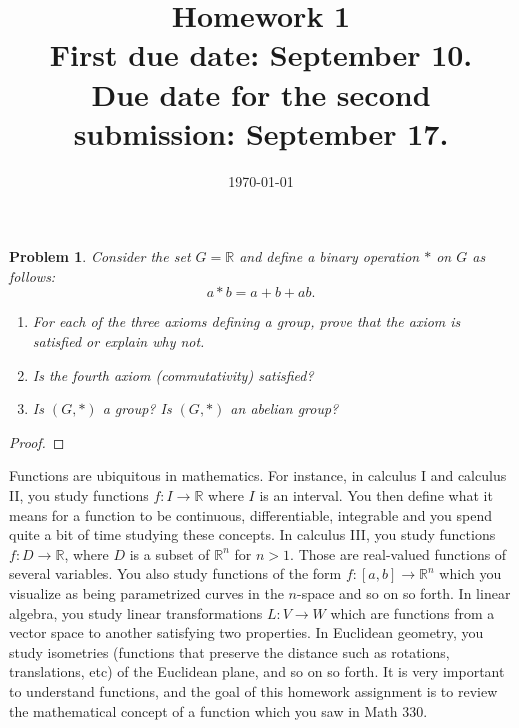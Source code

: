 \documentclass[reqno]{amsart}
\theoremstyle{plain}
\newtheorem{problem}{Problem}
\theoremstyle{definition}
\begin{document}
 

\title[Homework 1]{Homework 1 \\ First due date: September 10.  \\  Due date for the second submission:  September 17.}

\date{\today} 
\maketitle 


\begin{problem}
Consider the set $G = \mathbb{R}$ and define a binary operation $*$ on $G$ as follows:
$$a*b = a + b + ab.$$
\begin{enumerate}
\item For each of the three axioms defining a group, prove that the axiom is satisfied or explain why not. \label{one}
\item Is the fourth axiom (commutativity) satisfied? \label{two}
\item Is $(G,*)$ a group?  Is $(G,*)$ an abelian group? \label{three}
\end{enumerate}
\end{problem}

\begin{proof}

\end{proof}

Functions are ubiquitous in mathematics.  For instance, in calculus I and calculus II, you study functions $f:I \longrightarrow \mathbb{R}$ where $I$ is an interval.  You then define what it means for a function to be continuous, differentiable, integrable and you spend quite a bit of time studying these concepts.  In calculus III, you study functions $f:D \longrightarrow \mathbb{R}$, where $D$ is a subset of $\mathbb{R}^{n}$ for $n > 1$.  Those are real-valued functions of several variables.  You also study functions of the form $f:[a,b]\longrightarrow \mathbb{R}^{n}$ which you visualize as being parametrized curves in the $n$-space and so on so forth.  In linear algebra, you study linear transformations $L:V \longrightarrow W$ which are functions from a vector space to another satisfying two properties.  In Euclidean geometry, you study isometries (functions that preserve the distance such as rotations, translations, etc) of the Euclidean plane, and so on so forth.  It is very important to understand functions, and the goal of this homework assignment is to review the mathematical concept of a function which you saw in  Math 330.
\end{document}

